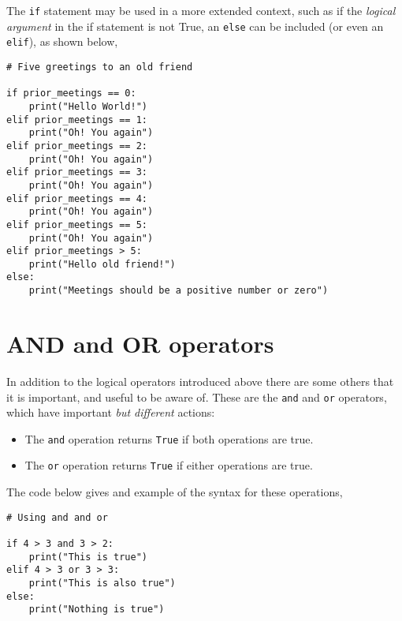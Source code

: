 \documentclass[a4paper]{article}
\begin{document}
The \texttt{if} statement may be used in a more extended context, such as if the \emph{logical argument} in the if statement is not True, an \texttt{else} can be included (or even an \texttt{elif}), as shown below,
\begin{lstlisting}
# Five greetings to an old friend

if prior_meetings == 0:
    print("Hello World!")
elif prior_meetings == 1:
    print("Oh! You again")
elif prior_meetings == 2:
    print("Oh! You again")
elif prior_meetings == 3:
    print("Oh! You again")
elif prior_meetings == 4:
    print("Oh! You again")
elif prior_meetings == 5:
    print("Oh! You again")
elif prior_meetings > 5:
	print("Hello old friend!")
else:
	print("Meetings should be a positive number or zero")
\end{lstlisting}

\section{AND and OR operators}

In addition to the logical operators introduced above there are some others that it is important, and useful to be aware of. 
These are the \texttt{and} and \texttt{or} operators, which have important \emph{but different} actions:
\begin{itemize}
	\item{The \texttt{and} operation returns \texttt{True} if both operations are true.}
	\item{The \texttt{or} operation returns \texttt{True} if either operations are true.}
\end{itemize}
The code below gives and example of the syntax for these operations, 
\begin{lstlisting}
# Using and and or

if 4 > 3 and 3 > 2:
	print("This is true")
elif 4 > 3 or 3 > 3:
	print("This is also true")
else:
	print("Nothing is true")
\end{lstlisting}
\vspace{\baselineskip}
\begin{center}
	\noindent{}
\end{center}
\end{document}

